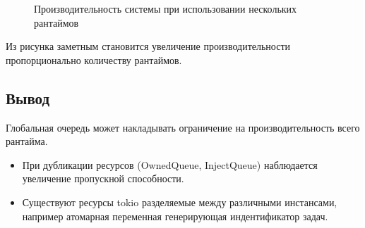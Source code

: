 \begin{figure}[H]
    \begin{center}
    \end{center}

    \caption{Производительность системы при использовании нескольких рантаймов}
    \label{fig:tatlin:multi_rt:eval}
\end{figure}

Из рисунка заметным становится увеличение производительности пропорционально количеству рантаймов.

\subsection{Вывод}

Глобальная очередь может накладывать ограничение на производительность всего рантайма.

\begin{itemize}
    \item При дубликации ресурсов (OwnedQueue, InjectQueue) наблюдается увеличение пропускной способности.
    \item Существуют ресурсы tokio разделяемые между различными инстансами, например атомарная переменная генерирующая индентификатор задач.
\end{itemize}
